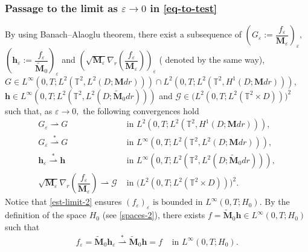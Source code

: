 \documentclass[a4paper,12pt, reqno]{amsart}
\begin{document}
  \subsubsection*{Passage to the limit as $\varepsilon\to 0$ in \eqref{eq-to-test}}
By using Banach–Alaoglu theorem, there exist a subsequence of  $(G_\varepsilon:=\dfrac{f_\varepsilon}{\mathbf{M}_\varepsilon})_\varepsilon,$ $(\mathbf{h}_\varepsilon:=\dfrac{f_\varepsilon}{ \widetilde{\mathbf{M}}_0})_\varepsilon $  and $(\sqrt{\mathbf{M}_\varepsilon}\nabla_r(\dfrac{f_\varepsilon}{\mathbf{M}_\varepsilon}))_\varepsilon$ ( denoted by the same way), $G\in L^\infty(0, T;L^2(\mathbb{T}^2,L^2(D;\mathbf{M}dr)))\cap L^2(0, T;L^2(\mathbb{T}^2,H^1(D;\mathbf{M}dr)))$, $\mathbf{h}\in L^\infty(0, T;L^2(\mathbb{T}^2,L^2(D; \widetilde{\mathbf{M}}_0dr)))$ and  $\mathcal{G}\in \big(L^2(0, T;L^2(\mathbb{T}^2\times D))\big)^2$  such that, as $\varepsilon \to 0,$ the following convergences hold
	\begin{align}
		G_\varepsilon \rightharpoonup G &\text{		in	}  L^2(0, T;L^2(\mathbb{T}^2,H^1(D;\mathbf{M}dr))),\label{cv-appro-3-eps-G}\\
		G_\varepsilon \overset{*}{\rightharpoonup} G &\text{		in	}  L^\infty(0, T;L^2(\mathbb{T}^2,L^2(D;\mathbf{M}dr))),\label{cv-appro-4-eps-G}\\
        \mathbf{h}_\varepsilon \overset{*}{\rightharpoonup} \mathbf{h} &\text{		in	}  L^\infty(0, T;L^2(\mathbb{T}^2,L^2(D;\widetilde{\mathbf{M}}_0dr)))\label{cv-appro-5-eps-h},\\
        \sqrt{\mathbf{M}_\varepsilon}\nabla_r(\dfrac{f_\varepsilon}{\mathbf{M}_\varepsilon}) \rightharpoonup  \mathcal{G} &\text{  in }  \big(L^2(0, T;L^2(\mathbb{T}^2\times D))\big)^2.\label{cv-appro-6-eps-h}
	\end{align} Notice that \eqref{est-limit-2} ensures 
$  (f_\varepsilon)_\varepsilon  \text{ is bounded in }  L^\infty(0, T;H_0).$
     By the definition of the space $H_0$ (see \eqref{spaces-2}),  there exists $f=\widetilde{\mathbf{M}}_0\mathbf{h}\in L^\infty(0, T;H_0)$ such that
	\begin{align}
		f_\varepsilon= \widetilde{\mathbf{M}}_0 \mathbf{h}_\varepsilon\overset{*}{\rightharpoonup} \widetilde{\mathbf{M}}_0\mathbf{h}=f &\text{		in	}  L^\infty(0, T;H_0).\label{cv-appro-h-KEY}
	\end{align} 
\end{document}
